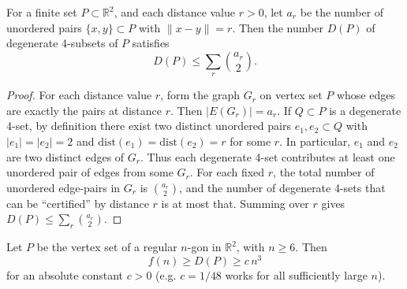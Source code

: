 \begin{lemma}
For a finite set \(P\subset\mathbb{R}^2\), and each distance value \(r>0\), let
\(a_r\) be the number of unordered pairs \(\{x,y\}\subset P\) with \(\|x-y\|=r\).
Then the number \(D(P)\) of degenerate 4-subsets of \(P\) satisfies
\[
 D(P)\le \sum_{r} \binom{a_r}{2}.
\]
\end{lemma}

\begin{proof}
For each distance value \(r\), form the graph \(G_r\) on vertex set \(P\) whose edges are exactly the pairs at distance \(r\). Then \(|E(G_r)|=a_r\).
If \(Q\subset P\) is a degenerate 4-set, by definition there exist two distinct unordered pairs
\(e_1,e_2\subset Q\) with \(|e_1|=|e_2|=2\) and \(\mathrm{dist}(e_1)=\mathrm{dist}(e_2)=r\) for some \(r\).
In particular, \(e_1\) and \(e_2\) are two distinct edges of \(G_r\).
Thus each degenerate 4-set contributes at least one unordered pair of edges from some \(G_r\).
For each fixed \(r\), the total number of unordered edge-pairs in \(G_r\) is \(\binom{a_r}{2}\), and the number of degenerate 4-sets that can be ``certified'' by distance \(r\) is at most that.
Summing over \(r\) gives
\(D(P)\le \sum_r \binom{a_r}{2}\).
\end{proof}

\begin{lemma}
Let \(P\) be the vertex set of a regular \(n\)-gon in \(\mathbb{R}^2\), with \(n\ge 6\). Then
\[
 f(n)\ge D(P)\ge c\,n^3
\]
for an absolute constant \(c>0\) (e.g. \(c=1/48\) works for all sufficiently large \(n\)).
\end{lemma}


